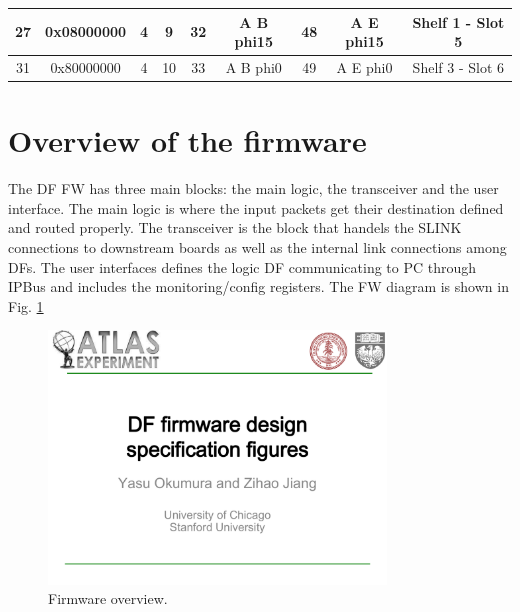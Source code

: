 \documentclass[11pt,letterpaper]{article}
\begin{document}
\begin{table}[]
\begin{tabular}{|c|c|c|c|c|c|c|c|c|}
27                     & 0x08000000            & 4                          & 9                         & 32                            & A B phi15                     & 48                            & A E phi15                     & Shelf 1 - Slot 5             \\ \hline
31                     & 0x80000000            & 4                          & 10                        & 33                            & A B phi0                      & 49                            & A E phi0                      & Shelf 3 - Slot 6             \\ \hline
\end{tabular}
\end{table}

\clearpage



\section{Overview of the firmware}

    The DF FW has three main blocks: the main logic, the transceiver and the user interface. The main logic is where the input packets get their destination defined and routed properly. The transceiver is the block that handels the SLINK connections to downstream boards as well as the internal link connections among DFs. The user interfaces defines the logic DF communicating to PC through IPBus and includes the monitoring/config registers. The FW diagram is shown in Fig. \ref{fig:OVERVIEW}


\begin{figure}[h!]
  \centering
  \includegraphics[width=0.80\textwidth,clip,page=3]{figures.pdf}
  \caption{Firmware overview.}
  \label{fig:OVERVIEW}
\end{figure}
\end{document}
